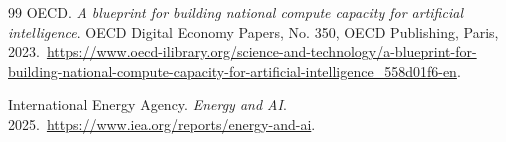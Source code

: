 \documentclass[11pt]{article}
\begin{document}
\begin{thebibliography}{99}
OECD. \emph{A blueprint for building national compute capacity for artificial intelligence}. OECD Digital Economy Papers, No. 350, OECD Publishing, Paris, 2023.\
\url{https://www.oecd-ilibrary.org/science-and-technology/a-blueprint-for-building-national-compute-capacity-for-artificial-intelligence_558d01f6-en}.

International Energy Agency. \emph{Energy and AI}. 2025.\
\url{https://www.iea.org/reports/energy-and-ai}.

\end{thebibliography}
\end{document}
